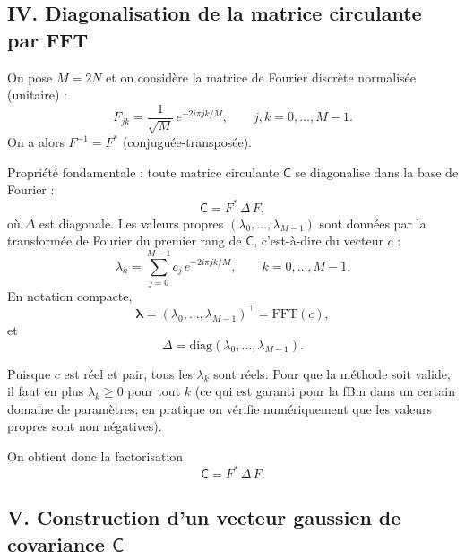 \documentclass[11pt,a4paper]{article}
\newcommand{\1}{\mathbf{1}}
\begin{document}
\subsection*{IV. Diagonalisation de la matrice circulante par FFT}

On pose $M=2N$ et on considère la matrice de Fourier discrète
normalisée (unitaire) :
\begin{equation}
  F_{jk}
  = \frac{1}{\sqrt{M}}\,
    e^{-2i\pi jk / M},
  \qquad j,k=0,\dots,M-1.
\end{equation}
On a alors $F^{-1} = F^{\ast}$ (conjuguée-transposée).

Propriété fondamentale : toute matrice circulante $\mathsf{C}$ se
diagonalise dans la base de Fourier :
\begin{equation}
  \mathsf{C}
  = F^{\ast}\,\Delta\,F,
\end{equation}
où $\Delta$ est diagonale. Les valeurs propres
$(\lambda_0,\dots,\lambda_{M-1})$ sont données par la transformée
de Fourier du premier rang de $\mathsf{C}$, c'est-à-dire
du vecteur $c$ :
\begin{equation}
  \lambda_k
  = \sum_{j=0}^{M-1}
      c_j\,e^{-2i\pi jk / M},
  \qquad k=0,\dots,M-1.
\end{equation}
En notation compacte,
\begin{equation}
  \bm{\lambda}
  =
  (\lambda_0,\dots,\lambda_{M-1})^\top
  = \mathrm{FFT}(c),
\end{equation}
et
\begin{equation}
  \Delta = \mathrm{diag}(\lambda_0,\dots,\lambda_{M-1}).
\end{equation}

Puisque $c$ est réel et pair, tous les $\lambda_k$ sont réels.
Pour que la méthode soit valide, il faut en plus
$\lambda_k\ge 0$ pour tout $k$ (ce qui est garanti pour la fBm
dans un certain domaine de paramètres; en pratique on vérifie
numériquement que les valeurs propres sont non négatives).

On obtient donc la factorisation
\begin{equation}
  \mathsf{C} = F^{\ast}\,\Delta\,F.
\end{equation}

\subsection*{V. Construction d'un vecteur gaussien de covariance $\mathsf{C}$}
\end{document}
